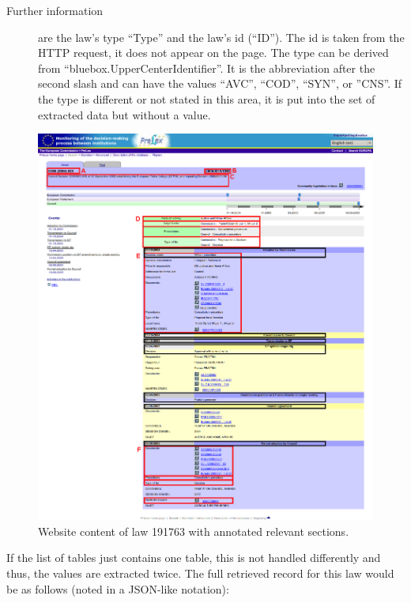 \documentclass{scrartcl}
\begin{document}
\begin{description}
\item[Further information] are the law's type ``Type'' and the law's id (``ID''). The id is taken from the HTTP request, it does not appear on the page. The type can be derived from ``bluebox.UpperCenterIdentifier''. It is the abbreviation after the second slash and can have the values ``AVC'', ``COD'', ``SYN'', or ''CNS''. If the type is different or not stated in this area, it is put into the set of extracted data but without a value.
\end{description}

\begin{figure}[ht]
\begin{center}
\includegraphics[width = \textwidth]{prelex.png}
\caption{Website content of law 191763 with annotated relevant sections.}
\label{fig:screenshot}
\end{center}
\end{figure}

\clearpage

If the list of tables just contains one table, this is not handled differently and thus, the values are extracted twice.
The full retrieved record for this law would be as follows (noted in a JSON-like notation):
\end{document}
